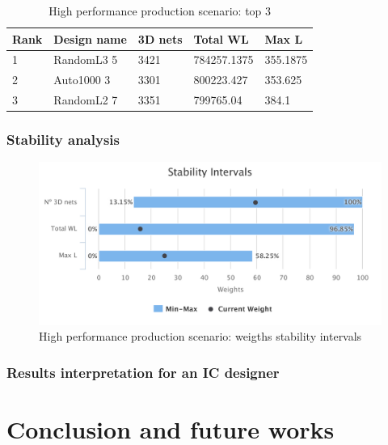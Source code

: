 \documentclass{svmult}
\begin{document}
\begin{table}[h!]
    \begin{center}
        \caption{High performance production scenario: top 3}
        \label{tab:top3perf}
        \begin{tabular}{p{1.2cm}p{2.3cm}p{1.5cm}p{2cm}p{1.3cm}}
            \hline
            Rank & Design name & 3D nets & Total WL & Max L\\
            \hline
            1 & RandomL3 5 & 3421 & 784257.1375 & 355.1875 \\
            2 & Auto1000 3 & 3301 & 800223.427 & 353.625 \\
            3 & RandomL2 7 & 3351 & 799765.04 & 384.1 \\
            \hline
        \end{tabular}
    \end{center}
\end{table}

\subsubsection*{Stability analysis}

\begin{figure}[h!]
    \centering
    \includegraphics[width=\linewidth]{stabilityperf}
    \caption{High performance production scenario: weigths stability intervals}
    \label{fig:stabilityperf}
\end{figure}

\subsubsection{Results interpretation for an IC designer}


\section{Conclusion and future works}




\end{document}
